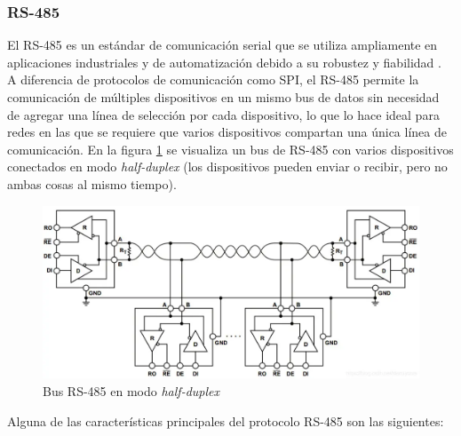 \subsubsection{RS-485}

El RS-485 es un estándar de comunicación serial que se utiliza ampliamente en aplicaciones industriales y de automatización debido a su robustez y fiabilidad \cite{rs485}. A diferencia de protocolos de comunicación como SPI, el RS-485 permite la comunicación de múltiples dispositivos en un mismo bus de datos sin necesidad de agregar una línea de selección por cada dispositivo, lo que lo hace ideal para redes en las que se requiere que varios dispositivos compartan una única línea de comunicación. En la figura \ref{fig:res485} se visualiza un bus de RS-485 con varios dispositivos conectados en modo \textit{half-duplex} (los dispositivos pueden enviar o recibir, pero no ambas cosas al mismo tiempo). \\ 

\begin{figure}[H]
    \centering
    \includegraphics[width =  \linewidth]{img/rs485.png}
    \caption{Bus RS-485 en modo \textit{half-duplex}}
    \label{fig:res485}
\end{figure}

Alguna de las características principales del protocolo RS-485 son las siguientes: 

